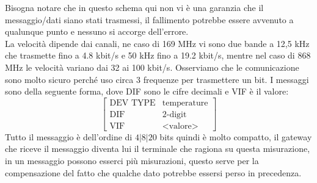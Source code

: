 \documentclass[11pt, twocolumn]{article}
\begin{document}
Bisogna notare che in questo schema qui non vi è una garanzia che il messaggio/dati siano stati trasmessi, il fallimento potrebbe essere avvenuto a qualunque punto e nessuno si accorge dell'errore.\\
La velocità dipende dai canali, ne caso di 169 MHz vi sono due bande a 12,5 kHz che trasmette fino a 4.8 kbit/s e 50 kHz fino a 19.2 kbit/s, mentre nel caso di 868 MHz le velocità variano dai 32 ai 100 kbit/s.
Osserviamo che le comunicazione sono molto sicuro perché uso circa 3 frequenze per trasmettere un bit.
I messaggi sono della seguente forma, dove DIF sono le cifre decimali e VIF è il valore:
\[
\begin{bmatrix}
  \text{DEV TYPE} & \text{temperature}\\
  \text{DIF} & \text{2-digit}\\
  \text{VIF} & \text{<valore>}
\end{bmatrix}
\]
Tutto il messaggio è dell'ordine di $4|8|20$ bits quindi è molto compatto, il gateway che riceve il messaggio diventa lui il terminale che ragiona su questa misurazione, in un messaggio possono esserci più misurazioni, questo serve per la compensazione del fatto che qualche dato potrebbe essersi perso in precedenza.
\end{document}
